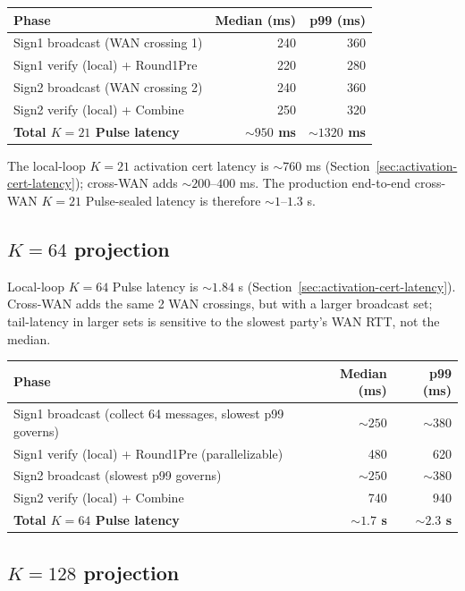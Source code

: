 \begin{tabular}{@{}lrr@{}}
  \toprule
  \textbf{Phase} & \textbf{Median (ms)} & \textbf{p99 (ms)} \\
  \midrule
  Sign1 broadcast (WAN crossing 1) & 240 & 360 \\
  Sign1 verify (local) + Round1Pre & 220 & 280 \\
  Sign2 broadcast (WAN crossing 2) & 240 & 360 \\
  Sign2 verify (local) + Combine & 250 & 320 \\
  \midrule
  \textbf{Total $K=21$ Pulse latency} & \textbf{$\sim 950$ ms} & \textbf{$\sim 1320$ ms} \\
  \bottomrule
\end{tabular}

The local-loop $K=21$ activation cert latency is $\sim 760$ ms (Section~\ref{sec:activation-cert-latency}); cross-WAN adds $\sim 200$--$400$ ms. The production end-to-end cross-WAN $K=21$ Pulse-sealed latency is therefore $\sim 1$--$1.3$ s.

\subsection{$K = 64$ projection}

Local-loop $K=64$ Pulse latency is $\sim 1.84$ s (Section~\ref{sec:activation-cert-latency}). Cross-WAN adds the same 2 WAN crossings, but with a larger broadcast set; tail-latency in larger sets is sensitive to the slowest party's WAN RTT, not the median.

\begin{tabular}{@{}lrr@{}}
  \toprule
  \textbf{Phase} & \textbf{Median (ms)} & \textbf{p99 (ms)} \\
  \midrule
  Sign1 broadcast (collect 64 messages, slowest p99 governs) & $\sim 250$ & $\sim 380$ \\
  Sign1 verify (local) + Round1Pre (parallelizable) & 480 & 620 \\
  Sign2 broadcast (slowest p99 governs) & $\sim 250$ & $\sim 380$ \\
  Sign2 verify (local) + Combine & 740 & 940 \\
  \midrule
  \textbf{Total $K=64$ Pulse latency} & \textbf{$\sim 1.7$ s} & \textbf{$\sim 2.3$ s} \\
  \bottomrule
\end{tabular}

\subsection{$K = 128$ projection}

